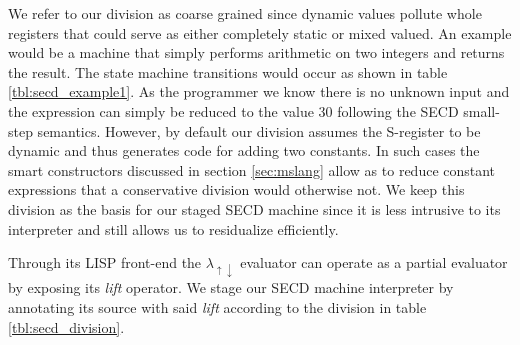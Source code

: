 \documentclass[a4paper,12pt,twoside,openright]{report}
\theoremstyle{definition}
\newcommand{\mslang}{$\lambda_{\uparrow\downarrow}$}
\begin{document}
We refer to our division as coarse grained since dynamic values pollute whole registers that could serve as either completely static or mixed valued. An example would be a machine that simply performs arithmetic on two integers and returns the result. The state machine transitions would occur as shown in table \ref{tbl:secd_example1}. As the programmer we know there is no unknown input and the expression can simply be reduced to the value 30 following the SECD small-step semantics. However, by default our division assumes the S-register to be dynamic and thus generates code for adding two constants. In such cases the smart constructors discussed in section \ref{sec:mslang} allow as to reduce constant expressions that a conservative division would otherwise not. We keep this division as the basis for our staged SECD machine since it is less intrusive to its interpreter and still allows us to residualize efficiently.

Through its LISP front-end the \mslang{} evaluator can operate as a partial evaluator by exposing its \textit{lift} operator. We stage our SECD machine interpreter by annotating its source with said \textit{lift} according to the division in table \ref{tbl:secd_division}.
\end{document}
